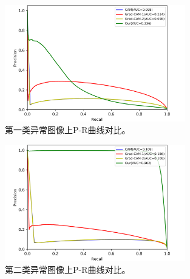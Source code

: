 \begin{figure}[H]
	\centering
	\includegraphics[width=0.7\textwidth]{figure/pr_curve_multi_skin/IMAGE_NET_pr_curve.png}
	\caption[第一类异常图像上P-R曲线对比]{第一类异常图像上P-R曲线对比。} 
	\label{fig:multi_simulate_pr_curve_image_net}
\end{figure}
\begin{figure}[H]
	\centering
	\includegraphics[width=0.7\textwidth]{figure/pr_curve_multi_skin/SKIN_pr_curve.png}
	\caption[第二类异常图像上P-R曲线对比]{第二类异常图像上P-R曲线对比。} 
	\label{fig:multi_simulate_pr_curve_skin}
\end{figure}
